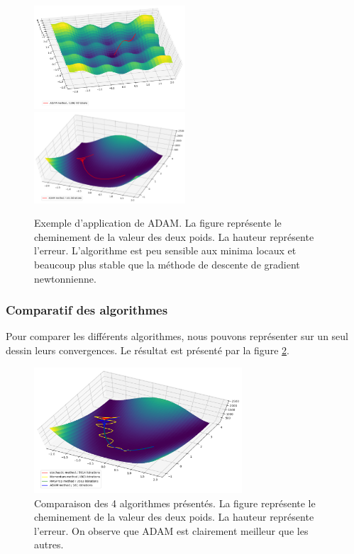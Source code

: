 \begin{figure}[!h]
\centering
\includegraphics[width=160pt]{"images/MLP/adam"}
\hspace*{5mm}
\includegraphics[width=160pt]{"images/MLP/adampropre"}
\caption{Exemple d'application de ADAM. La figure représente le cheminement de la valeur des deux poids. La hauteur représente l'erreur. L'algorithme est peu sensible aux minima locaux et beaucoup plus stable que la méthode de descente de gradient newtonnienne.}
\label{ADAM}
\end{figure}



\subsubsection{Comparatif des algorithmes}

Pour comparer les différents algorithmes, nous pouvons représenter sur un seul dessin leurs convergences. Le résultat est présenté par la figure \ref{Comparatifoptimiseurs}.

\begin{figure}[!h]
\centering
\includegraphics[width=220pt]{"images/MLP/comparatifoptimiseurs"}
\caption{Comparaison des 4 algorithmes présentés. La figure représente le cheminement de la valeur des deux poids. La hauteur représente l'erreur. On observe que ADAM est clairement meilleur que les autres.}
\label{Comparatifoptimiseurs}
\end{figure}

